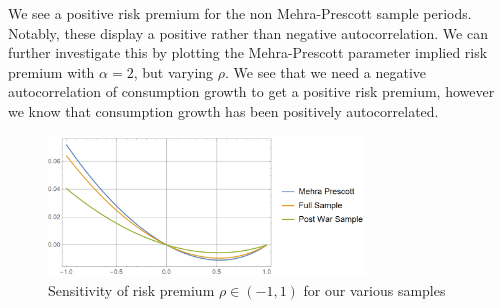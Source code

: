 \documentclass[french]{article}
\begin{document}
\begin{enumerate}[I.]
\begin{figure}[!htb]
 	 	\label{fig:risk_premium_alpha}
 \end{figure}
We see a positive risk premium for the non Mehra-Prescott sample periods. Notably, these display a positive rather than negative autocorrelation. We can further investigate this by plotting the Mehra-Prescott parameter implied risk premium with $\alpha = 2$, but varying $\rho$. We see that we need a negative autocorrelation of consumption growth to get a positive risk premium, however we know that consumption growth has been positively autocorrelated. 
  \begin{figure}[!htb]
 	\centering
 	\includegraphics[width=0.75\textwidth]{risk_premium_rho.png}
 	\caption{Sensitivity of risk premium $\rho\in(-1, 1)$ for our various samples}
 	\label{fig:risk_premium_rho}
 \end{figure}
\end{enumerate}
\end{document}
